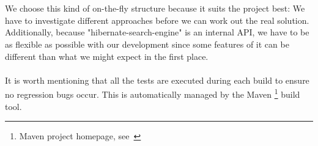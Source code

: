 \\\\
We choose this kind of on-the-fly structure because it suits the project best: We have to investigate different approaches before we can work out the real solution. Additionally, because "hibernate-search-engine" is an internal API, we have to be as flexible as possible with our development since some features of it can be different than what we might expect in the first place.
\\\\
It is worth mentioning that all the tests are executed during each build to ensure no regression bugs occur. This is automatically managed by the Maven \footnote{Maven project homepage, see~\cite{maven_homepage}} build tool.

\pagebreak
